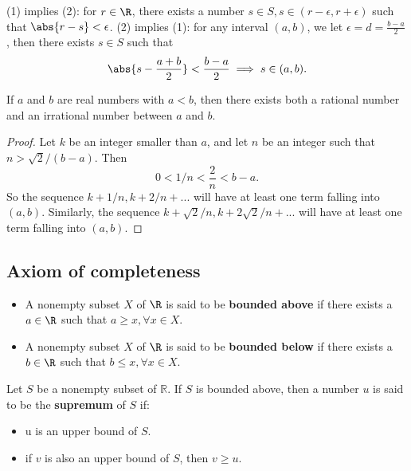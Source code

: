 \begin{refsection}
\begin{remark}\hfill
(1) implies (2): for $r \in \R$, there exists a number $s\in S, s\in (r-\epsilon,r+\epsilon)$ such that $\abs{r-s} < \epsilon$.
(2) implies (1): for any interval $(a,b)$, we let $\epsilon = d = \frac{b-a}{2}$, then there exists $s\in S$ such that $$\abs{s - \frac{a+b}{2}} < \frac{b-a}{2} \implies s \in (a,b).$$ 	
\end{remark}

\begin{theorem}\label{ch:sets:th:rationalIrrationalNumbersDense}\cite[23]{johnsonbaugh2010foundations}
If $a$ and $b$ are real numbers with $a < b$, then there exists both a rational number and an irrational number between $a$ and $b$.	
\end{theorem}
\begin{proof}
Let $k$ be an integer smaller than $a$, and let $n$ be an integer such that $n > \sqrt{2}/(b-a).$ Then
$$0<1/n< \frac{2}{n} < b-a.$$
So the sequence $k+1/n, k+2/n + ...$ will have at least one term falling into $(a,b)$.
Similarly, the sequence $k+\sqrt{2}/n, k+2\sqrt{2}/n + ...$ will have at least one term falling into $(a,b)$.
\end{proof}

\subsection{Axiom of completeness} 
\begin{definition}\hfill
	\begin{itemize}
		\item A nonempty subset $X$ of $\R$ is said to be \textbf{bounded above} if there exists a $a\in \R$ such that $a\geq x,\forall x\in X$.
		\item  A nonempty subset $X$ of $\R$ is said to be \textbf{bounded below} if there exists a $b\in \R$ such that $b\leq x,\forall x\in X$.
	\end{itemize}	
\end{definition}

\begin{definition}\cite[5]{johnsonbaugh2010foundations}
Let $S$ be a nonempty subset of $\mathbb{R}$. If $S$ is bounded above, then a number $u$ is said to be the \textbf{supremum} of $S$ if:
\begin{itemize}
\item u is an upper bound of $S$.
\item if $v$ is also an upper bound of $S$, then  $v \geq u$.
\end{itemize}
\end{definition}


\end{refsection}
